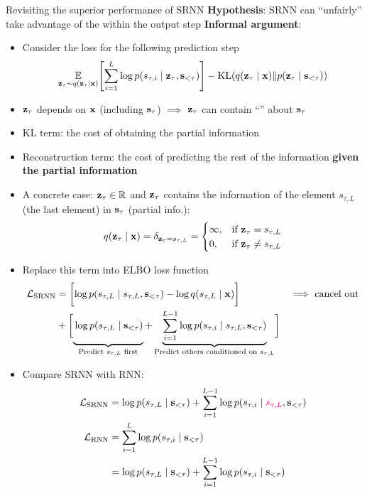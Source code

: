 \documentclass[final]{beamer}
\newlength{\colwidth}
\begin{document}
\begin{frame}[t]
\begin{columns}[t]
\begin{column}{\colwidth}
  \begin{block}{Revisiting the superior performance of SRNN}
		\textbf{Hypothesis}: SRNN can ``unfairly'' take advantage of the  within the output step
		\textbf{Informal argument}:
		\begin{itemize}
			\item Consider the loss for the following prediction step
			\[ \E_{\rvz_\tau \sim q(\rvz_{\tau} \mid \rvx)} \sbr{ \sum_{i=1}^{L} \log p(s_{\tau,i} \mid \rvz_\tau, \rvs_{<\tau}) } - \text{KL}\rbr{q(\rvz_{\tau} \mid \rvx) \| p(\rvz_{\tau} \mid \rvs_{<\tau})} \]
			\item ${\mathbf{z}}_{\tau}$ depends on ${\mathbf{x}}$ (including ${\mathbf{s}}_\tau$) $\implies$ ${\mathbf{z}}_{\tau}$ can contain ``'' about ${\mathbf{s}}_{\tau}$
			\item KL term: the cost of obtaining the partial information 
			\item Reconstruction term: the cost of predicting the rest of the information \textbf{given the partial information}
		\item A concrete case: ${\mathbf{z}}_{\tau} \in \mathbb{R}$ and ${\mathbf{z}}_{\tau}$ contains the information of the element $s_{\tau, L}$ (the last element) in ${\mathbf{s}}_{\tau}$ (partial info.):
		\[ q({\mathbf{z}}_{\tau} \mid {\mathbf{x}}) = \delta_{{\mathbf{z}}_{\tau} = s_{\tau, L}} = 
		\begin{cases}
		\infty, & \text{if ${\mathbf{z}}_{\tau} = s_{\tau, L}$} \\
		0, &\text{if ${\mathbf{z}}_{\tau} \neq s_{\tau, L}$} \\
		\end{cases} 
		\]
		
		\item Replace this term into ELBO loss function
		\begin{align*}
		\mc{L}_\text{SRNN} 
		&= \sbr[\bigg]{ \log p(s_{\tau,L} \mid s_{\tau,L}, \rvs_{<\tau}) - \log q(s_{\tau,L} \mid \rvx) } && \text{$\implies$ cancel out} \\
		&+ \sbr[\bigg]{ 
			\underbrace{\vphantom{\sum_{i=1}^{L-1}} \log p(s_{\tau,L} \mid \rvs_{<\tau})}_\text{Predict $s_{\tau,L}$ first} + 
			\underbrace{\sum_{i=1}^{L-1} \log p(s_{\tau,i} \mid s_{\tau,L}, \rvs_{<\tau}) }_\text{Predict others conditioned on $s_{\tau,L}$}}
		\end{align*}
		\item Compare SRNN with RNN:
		\begin{align*}
		\mathcal{L}_\text{SRNN} 
		&= \log p(s_{\tau,L} \mid {\mathbf{s}}_{<\tau}) + \sum_{i=1}^{L-1} \log p(s_{\tau,i} \mid {\color{magenta}s_{\tau,L}}, {\mathbf{s}}_{<\tau}) \\
		\mathcal{L}_\text{RNN} 
		&= \sum_{i=1}^{L} \log p(s_{\tau,i} \mid {\mathbf{s}}_{<\tau}) \\ 
		&= \log p(s_{\tau,L} \mid {\mathbf{s}}_{<\tau}) + \sum_{i=1}^{L-1} \log p(s_{\tau,i} \mid {\mathbf{s}}_{<\tau}) \\
		\end{align*}
	\end{itemize}
  \end{block}


\end{column}
\end{columns}
\end{frame}
\end{document}
